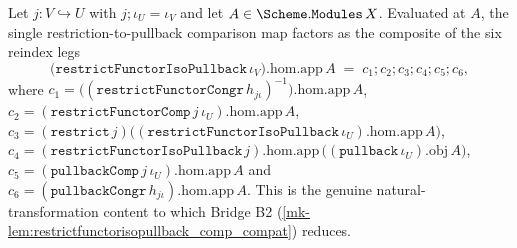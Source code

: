 \begin{lemma}\label{mk-lem:restrictfunctorisopullback_comp_compat_hom}
  \leanok

  Let \(j : V \hookrightarrow U\) with \(j \mathbin{;} \iota_U = \iota_V\) and let
  \(A \in \Scheme.\mathtt{Modules}\,X\). Evaluated at \(A\), the single restriction-to-pullback
  comparison map factors as the composite of the six reindex legs
  \[
    \bigl(\mathtt{restrictFunctorIsoPullback}\,\iota_V\bigr).\mathrm{hom}.\mathrm{app}\,A
      \;=\; c_1 \mathbin{;} c_2 \mathbin{;} c_3 \mathbin{;} c_4 \mathbin{;} c_5 \mathbin{;} c_6,
  \]
  where
  \(c_1 = \bigl((\mathtt{restrictFunctorCongr}\,h_{j\iota})^{-1}\bigr).\mathrm{hom}.\mathrm{app}\,A\),
  \(c_2 = (\mathtt{restrictFunctorComp}\,j\,\iota_U).\mathrm{hom}.\mathrm{app}\,A\),
  \(c_3 = (\mathtt{restrict}\,j)\bigl((\mathtt{restrictFunctorIsoPullback}\,\iota_U).\mathrm{hom}.\mathrm{app}\,A\bigr)\),
  \(c_4 = (\mathtt{restrictFunctorIsoPullback}\,j).\mathrm{hom}.\mathrm{app}\,\bigl((\mathtt{pullback}\,\iota_U).\mathrm{obj}\,A\bigr)\),
  \(c_5 = (\mathtt{pullbackComp}\,j\,\iota_U).\mathrm{hom}.\mathrm{app}\,A\) and
  \(c_6 = (\mathtt{pullbackCongr}\,h_{j\iota}).\mathrm{hom}.\mathrm{app}\,A\). This is the genuine
  natural-transformation content to which Bridge B2
  (\ref{mk-lem:restrictfunctorisopullback_comp_compat}) reduces.
\end{lemma}
